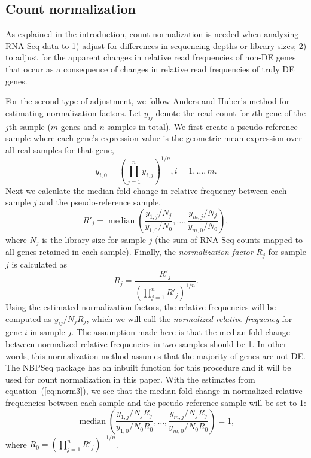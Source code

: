 \documentclass[letterpaper,12pt]{article}
\DeclareMathOperator{\median}{median}
\begin{document}
\subsection{Count normalization}\label{section:countNormalization}
As explained in the introduction, count normalization is needed when analyzing RNA-Seq data to
 1) adjust for differences in sequencing depths or
library sizes; 2) to adjust for the apparent changes in relative read
frequencies of non-DE genes that occur as a consequence of changes in relative read frequencies of truly DE genes.

For the second type of adjustment, we follow Anders and Huber's method
\citep{anders2010differential} for 
estimating normalization factors.  Let $y_{ij}$ denote the read count
for $i$th gene of the $j$th sample ($m$ genes and $n$ samples in total). We first
create a pseudo-reference sample where each gene's expression value is the 
geometric mean expression over all real samples for that gene,
\begin{equation}
 y_{i,0} = (\prod_{j=1}^ny_{i,j})^{1/n},  i=1, \ldots, m. 
\end{equation} 
Next we calculate the median fold-change in relative frequency between
each sample $j$ and the pseudo-reference sample,
\begin{equation}\label{eq:normfactors} 
    R'_j = \median \left(\dfrac{y_{1,j}/N_j}{y_{1,0}/N_{0}}, \ldots, \dfrac{y_{m,j}/N_j}{y_{m,0}/N_{0}}\right),
\end{equation}
where $N_j$ is the library size for sample $j$ (the sum of RNA-Seq
counts mapped to all genes retained in each sample). Finally, the
\textit{normalization factor}  $R_j$ for sample $j$ is calculated as 
\begin{equation}
    \label{eq:norm3}
R_j = \dfrac{R'_j}{(\prod_{j=1}^{n}R'_j)^{1/n}}.
\end{equation}
Using the estimated normalization factors, the relative frequencies will be
computed as $y_{ij}/{N_j R_j}$, which we will call the \textit{normalized relative frequency}
 for gene $i$ in sample $j$. The assumption made here is that the
median fold change between normalized relative frequencies in two samples should be 1. In
other words, this normalization method assumes that the majority of genes are
not DE. The NBPSeq package \citep{di2014package} has an inbuilt function for
this procedure and it will be used for count normalization in this paper. With
the estimates from equation~(\ref{eq:norm3}), we see that the median fold
change in normalized relative frequencies between each sample and the pseudo-reference
sample will be set to 1:
\begin{equation}
    \label{eq:medianfc}
    \median \left(\dfrac{y_{1,j}/ N_jR_j}{y_{1,0}/N_{0}R_0}, \ldots,
    \dfrac{y_{m,j}/N_j R_j}{y_{m,0}/N_{0}R_0} \right) = 1,
\end{equation}
where $R_0 = (\prod_{j=1}^{n}R'_j)^{-1/n}$.
\end{document}
